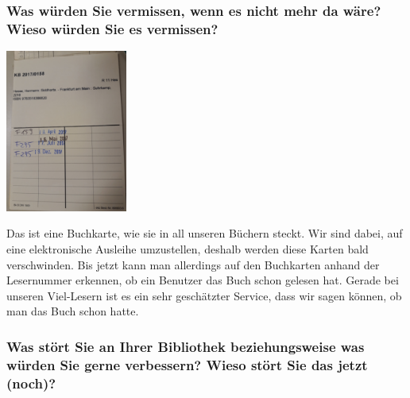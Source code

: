 \hypertarget{was-wuxfcrden-sie-vermissen-wenn-es-nicht-mehr-da-wuxe4re-wieso-wuxfcrden-sie-es-vermissen}{%
\subsubsection*{Was würden Sie vermissen, wenn es nicht mehr da wäre? Wieso
würden Sie es
vermissen?}\label{was-wuxfcrden-sie-vermissen-wenn-es-nicht-mehr-da-wuxe4re-wieso-wuxfcrden-sie-es-vermissen}}

\begin{center}
\includegraphics[width=0.3\textwidth]{patientenbibliothek/img/Buchkarte.jpg}
\end{center}

Das ist eine Buchkarte, wie sie in all unseren Büchern steckt. Wir sind
dabei, auf eine elektronische Ausleihe umzustellen, deshalb werden diese
Karten bald verschwinden. Bis jetzt kann man allerdings auf den
Buchkarten anhand der Lesernummer erkennen, ob ein Benutzer das Buch
schon gelesen hat. Gerade bei unseren Viel-Lesern ist es ein sehr
geschätzter Service, dass wir sagen können, ob man das Buch schon hatte.

\hypertarget{was-stuxf6rt-sie-an-ihrer-bibliothek-beziehungsweise-was-wuxfcrden-sie-gerne-verbessern-wieso-stuxf6rt-sie-das-jetzt-noch}{%
\subsubsection*{Was stört Sie an Ihrer Bibliothek beziehungsweise was würden
Sie gerne verbessern? Wieso stört Sie das jetzt
(noch)?}\label{was-stuxf6rt-sie-an-ihrer-bibliothek-beziehungsweise-was-wuxfcrden-sie-gerne-verbessern-wieso-stuxf6rt-sie-das-jetzt-noch}}

